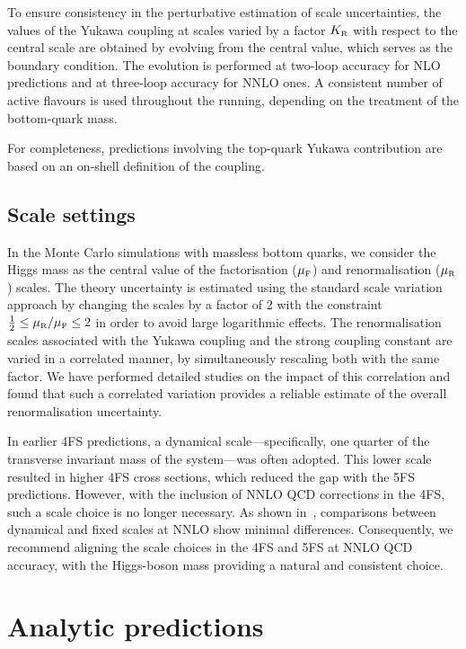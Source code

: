 \documentclass[11pt,a4paper]{article}
\begin{document}
To ensure consistency in the perturbative estimation of scale uncertainties, the values of the Yukawa coupling at scales varied by a factor $\KR$ with respect to the central scale are obtained by evolving from the central value, which serves as the boundary condition. The evolution is performed at two-loop accuracy for NLO predictions and at three-loop accuracy for NNLO ones. A consistent number of active flavours is used throughout the running, depending on the treatment of the bottom-quark mass.

For completeness, predictions involving the top-quark Yukawa contribution are based on an on-shell definition of the coupling.

\subsection{Scale settings}
In the Monte Carlo simulations with massless bottom quarks, we consider the Higgs mass as the central value of the factorisation ($\muF$) and renormalisation ($\muR$) scales. The theory uncertainty is estimated using the standard scale variation approach by changing the scales by a factor of 2 with the constraint $\frac{1}{2}\leq\muR/\muF\leq 2$ in order to avoid large logarithmic effects. The renormalisation scales associated with the Yukawa coupling and the strong coupling constant are varied in a correlated manner, by simultaneously rescaling both with the same factor. We have performed detailed studies on the impact of this correlation and found that such a correlated variation provides a reliable estimate of the overall renormalisation uncertainty.

In earlier 4FS predictions, a dynamical scale—specifically, one quarter of the transverse invariant mass of the \bbH{} system—was often adopted. This lower scale resulted in higher 4FS cross sections, which reduced the gap with the 5FS predictions. However, with the inclusion of NNLO QCD corrections in the 4FS, such a scale choice is no longer necessary. As shown in~, comparisons between dynamical and fixed scales at NNLO show minimal differences. Consequently, we recommend aligning the scale choices in the 4FS and 5FS at NNLO QCD accuracy, with the Higgs-boson mass providing a natural and consistent choice.

\section{Analytic predictions}
\end{document}
